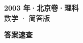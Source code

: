 \documentclass[zihao=-4, a4paper]{ctexart}
\begin{document}
\begin{center}
  {\Large\bfseries 2003 年·北京卷·理科}\\[4pt]
  {\large 数学 · 简答版}
\end{center}
\medskip
{}

\clearpage
{}
\begin{center}{\Large\bfseries 答案速查}\end{center}
\medskip

\end{document}
